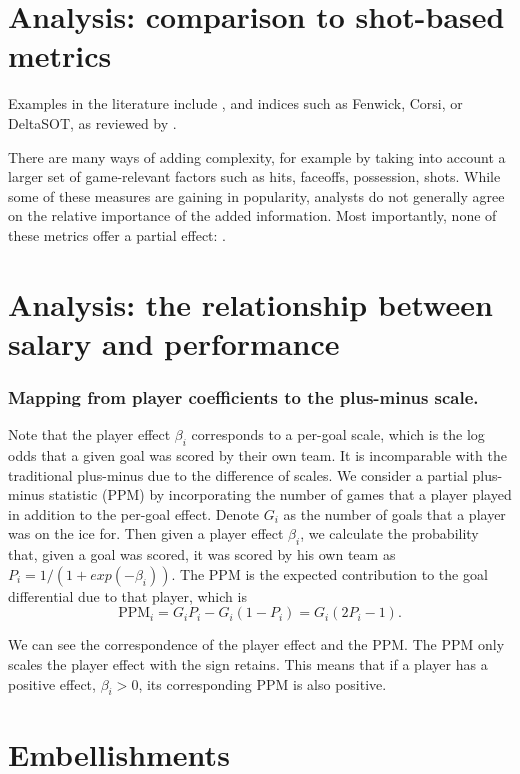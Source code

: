\section{Analysis: comparison to shot-based metrics}
\label{sec:shots}

Examples in
the literature include , and indices
such as Fenwick, Corsi, or DeltaSOT, as reviewed by \cite{vol10}. 

There are many
ways of adding complexity, for example by taking into account a larger set of
game-relevant factors such as hits, faceoffs, possession, shots.   While some
of these measures are gaining in popularity, analysts do not generally agree
on the relative importance of the added information.  Most importantly, none
of these metrics offer a partial effect: .

\section{Analysis: the relationship between salary and performance}
\label{sec:salary}


\subsubsection{Mapping from player coefficients to the plus-minus scale.}
\label{sec:ppm.mapping}
Note that the player effect $\beta_i$ corresponds to a per-goal scale, which is the log odds that a given goal was scored by their own team. It is incomparable with the traditional plus-minus due to the difference of scales. We consider a partial plus-minus statistic (PPM) by incorporating the number of games that a player played in addition to the per-goal effect. Denote $G_i$ as the number of goals that a player was on the ice for. Then given a player effect $\beta_i$, we calculate the probability that, given a goal was scored, it was scored by his own team as $P_i=1/(1+exp(-\beta_i))$. The PPM is the expected contribution to the goal differential due to that player, which is 
\begin{equation}
\text{PPM}_i = G_iP_i-G_i(1-P_i)=G_i(2P_i-1).
\label{eq:ppm}
\end{equation}

We can see the correspondence of the player effect and the PPM. The PPM only scales the player effect with the sign retains. This means that if a player has a positive effect, $\beta_i>0$, its corresponding PPM is also positive. 


\section{Embellishments}
\label{sec:embell}

